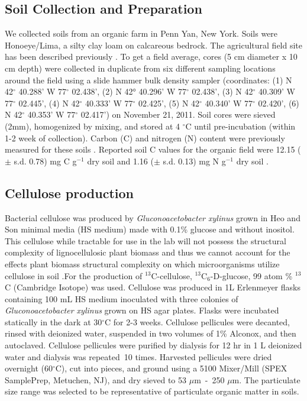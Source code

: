 \documentclass{article}
\begin{document}
\subsection{Soil Collection and Preparation} 
We collected soils from an organic farm in Penn Yan, New York. Soils were
Honoeye/Lima, a silty clay loam on calcareous bedrock. The agricultural
field site has been described previously \citep{Berthrong_2013}. To get a field average,
cores (5 cm diameter x 10 cm depth) were collected in duplicate from six
different sampling locations around the field using a slide hammer bulk density
sampler (coordinates: (1) N 42$^{\circ}$ 40.288’ W 77$^{\circ}$ 02.438’, (2)
N 42° 40.296’ W 77$^{\circ}$ 02.438’, (3) N 42$^{\circ}$ 40.309’ W 77$^{\circ}$
02.445’, (4) N 42$^{\circ}$ 40.333’ W 77$^{\circ}$ 02.425’, (5) N 42$^{\circ}$
   40.340’ W 77$^{\circ}$ 02.420’, (6) N 42$^{\circ}$ 40.353’ W 77$^{\circ}$
      02.417’) on November 21,
2011. Soil cores were sieved (2mm), homogenized by mixing, and stored at
      4 $^{\circ}$C until pre-incubation (within 1-2 week of collection).
        Carbon (C) and nitrogen (N) content were previously measured for these
        soils \citep{Berthrong_2013}. Reported soil C values for the organic
        field were
12.15 ($\pm$ s.d. 0.78) mg C g$^{-1}$ dry soil and 1.16 ($\pm$ s.d. 0.13) mg
   N g$^{-1}$ dry soil \citep{Berthrong_2013}. 

\subsection{Cellulose production}
Bacterial cellulose was produced by \textit{Gluconoacetobacter xylinus} grown
in Heo and Son \citep{Heo_2002} minimal media (HS medium) made with 0.1\%
glucose and without inositol. This cellulose while tractable for use in the lab
will not possess the structural complexity of lignocellulosic plant biomass and thus
we cannot account for the effects plant biomass structural complexity on which 
microorganisms utilize cellulose in soil .For the production of $^{13}$C-cellulose,
$^{13}$C$_{6}$-D-glucose, 99 atom \% $^{13}$C (Cambridge Isotope) was used. Cellulose
was produced in 1L Erlenmeyer flasks containing 100 mL HS medium inoculated
with three colonies of \textit{Gluconoacetobacter xylinus} grown on HS agar
plates. Flasks were incubated statically in the dark at 30$^{\circ}$C for 2-3
weeks. Cellulose pellicules were decanted, rinsed with deionized water,
suspended in two volumes of 1\% Alconox, and then autoclaved. Cellulose
pellicules were purified by dialysis for 12 hr in 1 L deionized water and
dialysis was repeated~10 times. Harvested pellicules were dried overnight
(60$^{\circ}$C), cut into pieces, and ground using a 5100 Mixer/Mill (SPEX
SamplePrep, Metuchen, NJ), and dry sieved to 53 $\mu$m - 250 $\mu$m. The particulate
size range was selected to be representative of particulate organic matter in
soils.
\end{document}
